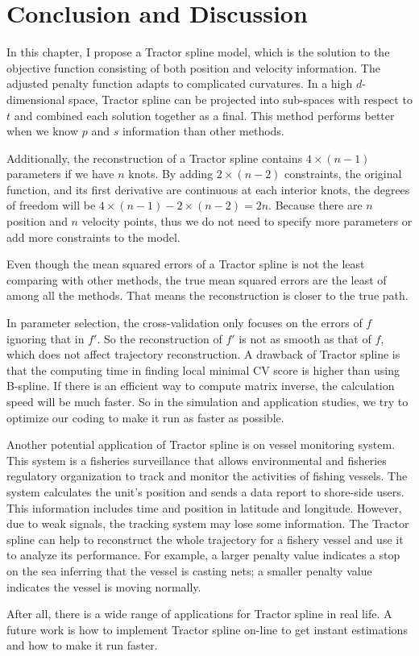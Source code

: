 
\section{Conclusion and Discussion}

In this chapter, I propose a Tractor spline model, which is the solution to the objective function consisting of both position and velocity information. The adjusted penalty function adapts to complicated curvatures. In a high $d$-dimensional space, Tractor spline can be projected into sub-spaces with respect to $t$ and combined each solution together as a final. This method performs better when we know $p$ and $s$ information than other methods. 

Additionally, the reconstruction of a Tractor spline contains $4\times (n-1)$ parameters if we have $n$ knots. By adding $2\times (n-2)$ constraints, the original function, and its first derivative are continuous at each interior knots, the degrees of freedom will be $4\times (n-1)-2\times (n-2)=2n$. Because there are $n$ position and $n$ velocity points, thus we do not need to specify more parameters or add more constraints to the model. 

Even though the mean squared errors of a Tractor spline is not the least comparing with other methods, the true mean squared errors are the least of among all the methods. That means the reconstruction is closer to the true path. 

In parameter selection, the cross-validation only focuses on the errors of $f$ ignoring that in $f'$. So the reconstruction of $f'$ is not as smooth as that of $f$, which does not affect trajectory reconstruction. A drawback of Tractor spline is that the computing time in finding local minimal CV score is higher than using B-spline. If there is an efficient way to compute matrix inverse, the calculation speed will be much faster. So in the simulation and application studies, we try to optimize our coding to make it run as faster as possible.

Another potential application of Tractor spline is on vessel monitoring system. This system is a fisheries surveillance that allows environmental and fisheries regulatory organization to track and monitor the activities of fishing vessels. The system calculates the unit's position and sends a data report to shore-side users. This information includes time and position in latitude and longitude. However, due to weak signals, the tracking system may lose some information. The Tractor spline can help to reconstruct the whole trajectory for a fishery vessel and use it to analyze its performance. For example, a larger penalty value indicates a stop on the sea inferring that the vessel is casting nets; a smaller penalty value indicates the vessel is moving normally. 

After all, there is a wide range of applications for Tractor spline in real life. A future work is how to implement Tractor spline on-line to get instant estimations and how to make it run faster. 

